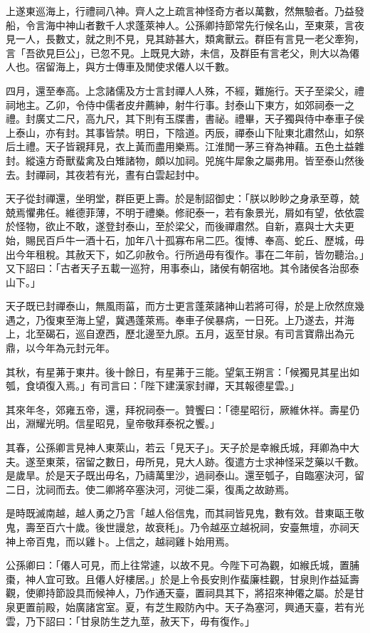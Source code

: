 \begin{pinyinscope}
上遂東巡海上，行禮祠八神。齊人之上疏言神怪奇方者以萬數，然無驗者。乃益發船，令言海中神山者數千人求蓬萊神人。公孫卿持節常先行候名山，至東萊，言夜見一人，長數丈，就之則不見，見其跡甚大，類禽獸云。群臣有言見一老父牽狗，言「吾欲見巨公」，已忽不見。上既見大跡，未信，及群臣有言老父，則大以為僊人也。宿留海上，與方士傳車及閒使求僊人以千數。

四月，還至奉高。上念諸儒及方士言封禪人人殊，不經，難施行。天子至梁父，禮祠地主。乙卯，令侍中儒者皮弁薦紳，射牛行事。封泰山下東方，如郊祠泰一之禮。封廣丈二尺，高九尺，其下則有玉牒書，書祕。禮畢，天子獨與侍中奉車子侯上泰山，亦有封。其事皆禁。明日，下陰道。丙辰，禪泰山下阯東北肅然山，如祭后土禮。天子皆親拜見，衣上黃而盡用樂焉。江淮閒一茅三脊為神藉。五色土益雜封。縱遠方奇獸蜚禽及白雉諸物，頗以加祠。兕旄牛犀象之屬弗用。皆至泰山然後去。封禪祠，其夜若有光，晝有白雲起封中。

天子從封禪還，坐明堂，群臣更上壽。於是制詔御史：「朕以眇眇之身承至尊，兢兢焉懼弗任。維德菲薄，不明于禮樂。修祀泰一，若有象景光，屑如有望，依依震於怪物，欲止不敢，遂登封泰山，至於梁父，而後禪肅然。自新，嘉與士大夫更始，賜民百戶牛一酒十石，加年八十孤寡布帛二匹。復博、奉高、蛇丘、歷城，毋出今年租稅。其赦天下，如乙卯赦令。行所過毋有復作。事在二年前，皆勿聽治。」又下詔曰：「古者天子五載一巡狩，用事泰山，諸侯有朝宿地。其令諸侯各治邸泰山下。」

天子既已封禪泰山，無風雨菑，而方士更言蓬萊諸神山若將可得，於是上欣然庶幾遇之，乃復東至海上望，冀遇蓬萊焉。奉車子侯暴病，一日死。上乃遂去，并海上，北至碣石，巡自遼西，歷北邊至九原。五月，返至甘泉。有司言寶鼎出為元鼎，以今年為元封元年。

其秋，有星茀于東井。後十餘日，有星茀于三能。望氣王朔言：「候獨見其星出如瓠，食頃復入焉。」有司言曰：「陛下建漢家封禪，天其報德星雲。」

其來年冬，郊雍五帝，還，拜祝祠泰一。贊饗曰：「德星昭衍，厥維休祥。壽星仍出，淵耀光明。信星昭見，皇帝敬拜泰祝之饗。」

其春，公孫卿言見神人東萊山，若云「見天子」。天子於是幸緱氏城，拜卿為中大夫。遂至東萊，宿留之數日，毋所見，見大人跡。復遣方士求神怪采芝藥以千數。是歲旱。於是天子既出毋名，乃禱萬里沙，過祠泰山。還至瓠子，自臨塞決河，留二日，沈祠而去。使二卿將卒塞決河，河徙二渠，復禹之故跡焉。

是時既滅南越，越人勇之乃言「越人俗信鬼，而其祠皆見鬼，數有效。昔東甌王敬鬼，壽至百六十歲。後世謾怠，故衰秏」。乃令越巫立越祝祠，安臺無壇，亦祠天神上帝百鬼，而以雞卜。上信之，越祠雞卜始用焉。

公孫卿曰：「僊人可見，而上往常遽，以故不見。今陛下可為觀，如緱氏城，置脯棗，神人宜可致。且僊人好樓居。」於是上令長安則作蜚廉桂觀，甘泉則作益延壽觀，使卿持節設具而候神人，乃作通天臺，置祠具其下，將招來神僊之屬。於是甘泉更置前殿，始廣諸宮室。夏，有芝生殿防內中。天子為塞河，興通天臺，若有光雲，乃下詔曰：「甘泉防生芝九莖，赦天下，毋有復作。」


\end{pinyinscope}
